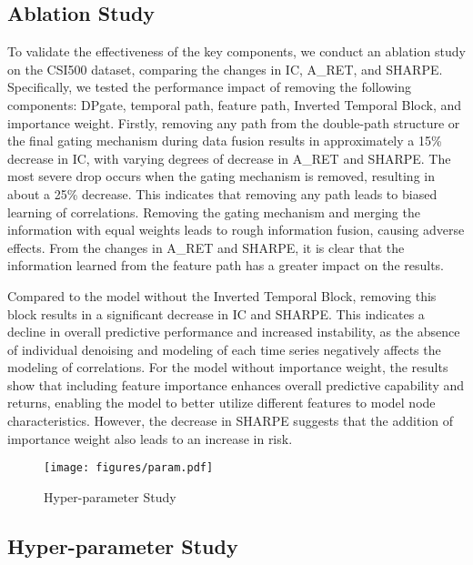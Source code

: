 \subsection{Ablation Study}
To validate the effectiveness of the key components, we conduct an ablation study on the CSI500 dataset, comparing the changes in IC, A\_RET, and SHARPE. Specifically, we tested the performance impact of removing the following components: DPgate, temporal path, feature path, Inverted Temporal Block, and importance weight. Firstly, removing any path from the double-path structure or the final gating mechanism during data fusion results in approximately a 15\% decrease in IC, with varying degrees of decrease in A\_RET and SHARPE. The most severe drop occurs when the gating mechanism is removed, resulting in about a 25\% decrease. This indicates that removing any path leads to biased learning of correlations. Removing the gating mechanism and merging the information with equal weights leads to rough information fusion, causing adverse effects. From the changes in A\_RET and SHARPE, it is clear that the information learned from the feature path has a greater impact on the results. 

Compared to the model without the Inverted Temporal Block, removing this block results in a significant decrease in IC and SHARPE. This indicates a decline in overall predictive performance and increased instability, as the absence of individual denoising and modeling of each time series negatively affects the modeling of correlations. For the model without importance weight, the results show that including feature importance enhances overall predictive capability and returns, enabling the model to better utilize different features to model node characteristics. However, the decrease in SHARPE suggests that the addition of importance weight also leads to an increase in risk.

\begin{figure}[thbp]
    \centering
    \texttt{[image: figures/param.pdf]}
    \caption[width=\textwidth]{Hyper-parameter Study}
    \label{fig:params}
\end{figure}

\subsection{Hyper-parameter Study}

